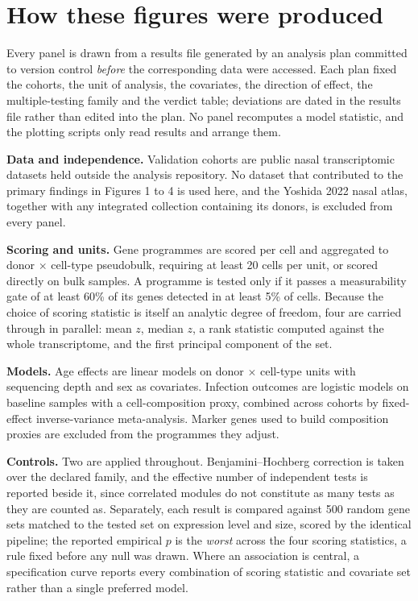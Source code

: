 \documentclass[11pt,a4paper]{article}
\begin{document}
\section*{How these figures were produced}

Every panel is drawn from a results file generated by an analysis plan committed to version
control \emph{before} the corresponding data were accessed. Each plan fixed the cohorts, the
unit of analysis, the covariates, the direction of effect, the multiple-testing family and
the verdict table; deviations are dated in the results file rather than edited into the plan.
No panel recomputes a model statistic, and the plotting scripts only read results and arrange
them.

\textbf{Data and independence.} Validation cohorts are public nasal transcriptomic datasets
held outside the analysis repository. No dataset that contributed to the primary findings in
Figures 1 to 4 is used here, and the Yoshida 2022 nasal atlas, together with any integrated
collection containing its donors, is excluded from every panel.

\textbf{Scoring and units.} Gene programmes are scored per cell and aggregated to donor
$\times$ cell-type pseudobulk, requiring at least 20 cells per unit, or scored directly on
bulk samples. A programme is tested only if it passes a measurability gate of at least 60\%
of its genes detected in at least 5\% of cells. Because the choice of scoring statistic is
itself an analytic degree of freedom, four are carried through in parallel: mean $z$,
median $z$, a rank statistic computed against the whole transcriptome, and the first
principal component of the set.

\textbf{Models.} Age effects are linear models on donor $\times$ cell-type units with
sequencing depth and sex as covariates. Infection outcomes are logistic models on baseline
samples with a cell-composition proxy, combined across cohorts by fixed-effect
inverse-variance meta-analysis. Marker genes used to build composition proxies are excluded
from the programmes they adjust.

\textbf{Controls.} Two are applied throughout. Benjamini--Hochberg correction is taken over
the declared family, and the effective number of independent tests is reported beside it,
since correlated modules do not constitute as many tests as they are counted as. Separately,
each result is compared against 500 random gene sets matched to the tested set on expression
level and size, scored by the identical pipeline; the reported empirical $p$ is the
\emph{worst} across the four scoring statistics, a rule fixed before any null was drawn.
Where an association is central, a specification curve reports every combination of scoring
statistic and covariate set rather than a single preferred model.
\end{document}
